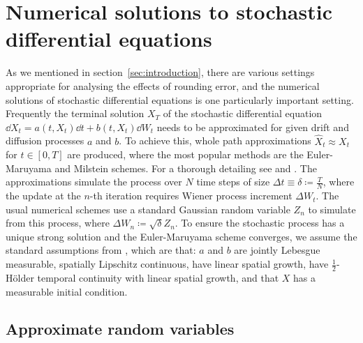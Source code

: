 \documentclass[manuscript,review]{acmart}
\begin{document}
\section{Numerical solutions to stochastic differential equations}
\label{sec:numerical_solutions_to_stochastic_differential_equations}

As we mentioned in section~\ref{sec:introduction}, there are various settings appropriate for analysing the effects of rounding error, and the numerical solutions of stochastic differential equations is one particularly important setting. Frequently the terminal solution $ X_T $ of the stochastic differential equation $ \dd{X_t} = a(t, X_t) \dd{t} + b(t, X_t)\dd{W_t} $ needs to be approximated for given drift and diffusion processes $ a $ and $ b $. To achieve this, whole path approximations $ \widehat{X}_t \approx X_t $ for $ t \in [0, T] $ are produced, where the most popular methods are the Euler-Maruyama and Milstein schemes. For a thorough  detailing see \citet{kloeden1999numerical} and \citet{glasserman2013monte}. The approximations simulate the process over $ N $ time steps of size $ \Delta t \equiv \delta \coloneqq \tfrac{T}{N} $, where the update at the $ n $-th iteration requires Wiener process increment $ \Delta W_t $. The usual numerical schemes use a standard Gaussian random variable $ Z_n $ to simulate from this process, where $ \Delta W_n \coloneqq \sqrt{\delta} Z_n $. To ensure the stochastic process has a unique strong solution and the Euler-Maruyama scheme converges, we assume the standard assumptions from \citet[4.5]{kloeden1999numerical}, which are that: $ a $ and $ b $ are jointly Lebesgue measurable, spatially Lipschitz continuous, have linear spatial growth, have $ \tfrac{1}{2} $-H\"{o}lder temporal continuity with linear spatial growth, and that $ X $ has a measurable initial condition.

\subsection{Approximate random variables}
\label{sec:approximate_random_variables}
\end{document}
